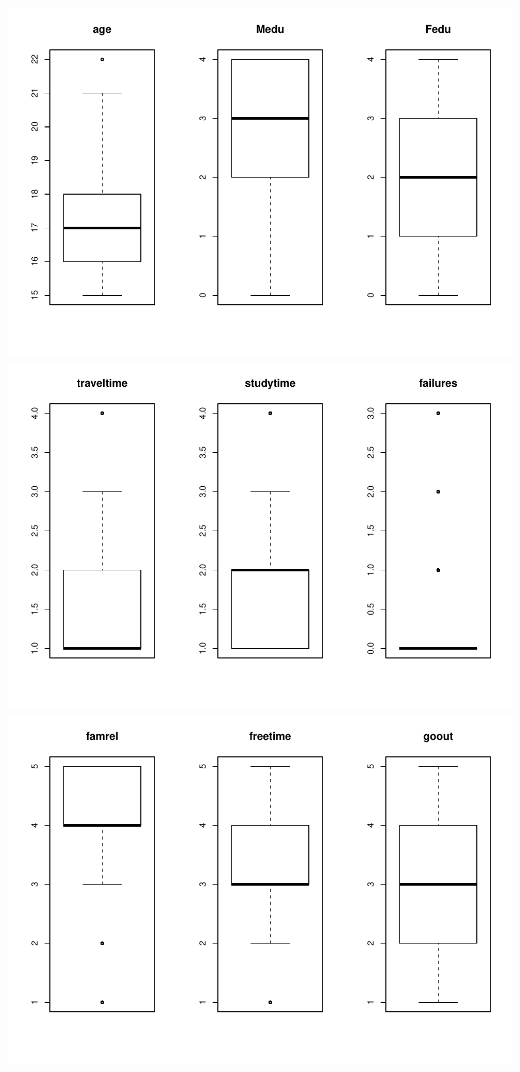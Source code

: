 \documentclass[]{article}
\begin{document}
\includegraphics{Practica2_files/figure-latex/unnamed-chunk-13-1.pdf}
\includegraphics{Practica2_files/figure-latex/unnamed-chunk-13-2.pdf}
\includegraphics{Practica2_files/figure-latex/unnamed-chunk-13-3.pdf}
\end{document}
